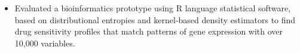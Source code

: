 \documentclass[10pt,a4paper]{altacv}
\begin{document}

\begin{itemize}
  \item \small{Evaluated a bioinformatics prototype using R language statistical software, based on distributional entropies and kernel-based density estimators to find drug sensitivity profiles that match patterns of gene expression with over 10,000 variables.}
\end{itemize}







\end{document}
